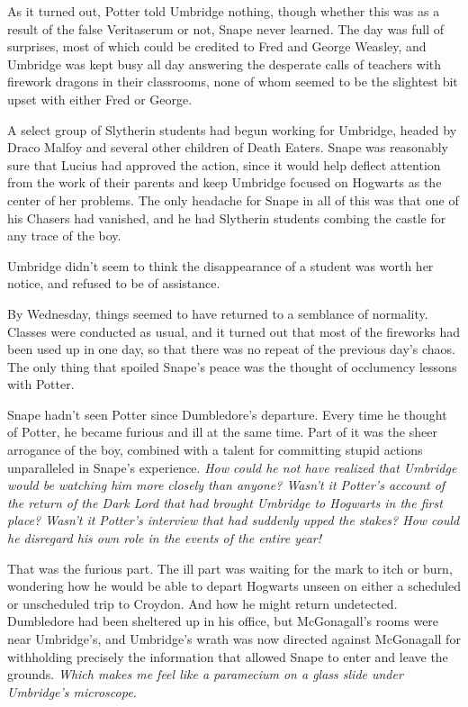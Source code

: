 As it turned out, Potter told Umbridge nothing, though whether this was as a result of the false Veritaserum or not, Snape never learned. The day was full of surprises, most of which could be credited to Fred and George Weasley, and Umbridge was kept busy all day answering the desperate calls of teachers with firework dragons in their classrooms, none of whom seemed to be the slightest bit upset with either Fred or George.

A select group of Slytherin students had begun working for Umbridge, headed by Draco Malfoy and several other children of Death Eaters. Snape was reasonably sure that Lucius had approved the action, since it would help deflect attention from the work of their parents and keep Umbridge focused on Hogwarts as the center of her problems. The only headache for Snape in all of this was that one of his Chasers had vanished, and he had Slytherin students combing the castle for any trace of the boy.

Umbridge didn't seem to think the disappearance of a student was worth her notice, and refused to be of assistance.

By Wednesday, things seemed to have returned to a semblance of normality. Classes were conducted as usual, and it turned out that most of the fireworks had been used up in one day, so that there was no repeat of the previous day's chaos. The only thing that spoiled Snape's peace was the thought of occlumency lessons with Potter.

Snape hadn't seen Potter since Dumbledore's departure. Every time he thought of Potter, he became furious and ill at the same time. Part of it was the sheer arrogance of the boy, combined with a talent for committing stupid actions unparalleled in Snape's experience. \emph{How could he not have realized that Umbridge would be watching him more closely than anyone? Wasn't it Potter's account of the return of the Dark Lord that had brought Umbridge to Hogwarts in the first place? Wasn't it Potter's interview that had suddenly upped the stakes? How could he disregard his own role in the events of the entire year!}

That was the furious part. The ill part was waiting for the mark to itch or burn, wondering how he would be able to depart Hogwarts unseen on either a scheduled or unscheduled trip to Croydon. And how he might return undetected. Dumbledore had been sheltered up in his office, but McGonagall's rooms were near Umbridge's, and Umbridge's wrath was now directed against McGonagall for withholding precisely the information that allowed Snape to enter and leave the grounds. \emph{Which makes me feel like a paramecium on a glass slide under Umbridge's microscope.}

